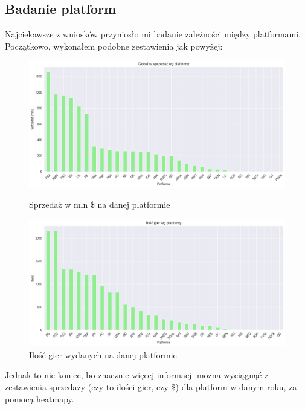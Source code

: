 \documentclass[11pt]{article}
\begin{document}
\subsection{Badanie platform}\label{subsec:badanie-platform}
Najciekawsze z wniosków przyniosło mi badanie zależności między platformami.
Początkowo, wykonałem podobne zestawienia jak powyżej:

\begin{figure}[H]
    \centering
    \begin{minipage}[t]{0.48\linewidth}
        \centering
        \includegraphics[width=\linewidth]{figures/platforma-sprzedaz}
        \caption{Sprzedaż w mln \$ na danej platformie}
        \label{fig:platform}
    \end{minipage}
    \hfill
    \begin{minipage}[t]{0.48\linewidth}
        \centering
        \includegraphics[width=\linewidth]{figures/platforma-ilosc}
        \caption{Ilość gier wydanych na danej platformie}
        \label{fig:platform2}
    \end{minipage}
\end{figure}

Jednak to nie koniec, bo znacznie więcej informacji można wyciągnąć z zestawienia sprzedaży (czy to ilości gier, czy \$) dla platform w danym roku, za pomocą heatmapy.
\end{document}
